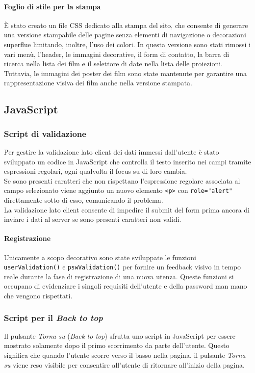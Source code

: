 \paragraph{Foglio di stile per la stampa} È stato creato un file CSS dedicato alla stampa del sito, che consente di generare una versione stampabile delle pagine senza elementi di navigazione o decorazioni superflue limitando, inoltre, l'uso dei colori. In questa versione sono stati rimossi i vari menù, l'header, le immagini decorative, il form di contatto, la barra di ricerca nella lista dei film e il selettore di date nella lista delle proiezioni. Tuttavia, le immagini dei poster dei film sono state mantenute per garantire una rappresentazione visiva dei film anche nella versione stampata.

\subsection{JavaScript}

\subsubsection{Script di validazione}
Per gestire la validazione lato client dei dati immessi dall'utente è stato sviluppato un codice in JavaScript che controlla il testo inserito nei campi tramite espressioni regolari, ogni qualvolta il focus su di loro cambia.\\
Se sono presenti caratteri che non rispettano l'espressione regolare associata al campo selezionato viene aggiunto un nuovo elemento \texttt{<p>} con \texttt{role="alert"} direttamente sotto di esso, comunicando il problema.\\
La validazione lato client consente di impedire il submit del form prima ancora di inviare i dati al server se sono presenti caratteri non validi.

\paragraph{Registrazione} Unicamente a scopo decorativo sono state sviluppate le funzioni\\ \texttt{userValidation()} e \texttt{pswValidation()} per fornire un feedback visivo in tempo reale durante la fase di registrazione di una nuova utenza. Queste funzioni si occupano di evidenziare i singoli requisiti dell'utente e della password man mano che vengono rispettati.

\subsubsection{Script per il \textit{Back to top}}
Il pulsante \textit{Torna su} (\textit{Back to top}) sfrutta uno script in JavaScript per essere mostrato solamente dopo il primo scorrimento da parte dell'utente. Questo significa che quando l'utente scorre verso il basso nella pagina, il pulsante \textit{Torna su} viene reso visibile per consentire all'utente di ritornare all'inizio della pagina.

